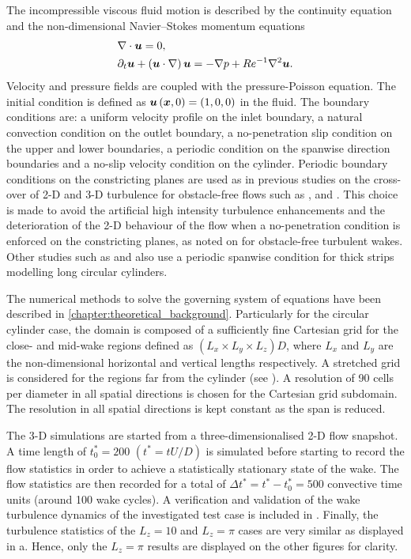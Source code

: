 \documentclass[../main.tex]{subfiles}
\begin{document}
The incompressible viscous fluid motion is described by the continuity equation and the non-dimensional Navier--Stokes momentum equations
\begin{eqnarray}
&\nabla\cdot\boldsymbol{u}=0,\label{eq:mass}\\
&\partial_{t}\boldsymbol{u}+\left(\boldsymbol{u}\cdot\nabla \right) \boldsymbol{u}=-\nabla p+Re^{-1}\nabla^2\boldsymbol{u}.
\end{eqnarray}
Velocity and pressure fields are coupled with the pressure-Poisson equation. 
The initial condition is defined as $\boldsymbol{u}\left(\boldsymbol{x}, 0\right)=\left(1,0,0\right)$ in the fluid.
The boundary conditions are: a uniform velocity profile on the inlet boundary, a natural convection condition on the outlet boundary, a no-penetration slip condition on the upper and lower boundaries, a periodic condition on the spanwise direction boundaries and a no-slip velocity condition on the cylinder.
Periodic boundary conditions on the constricting planes are used as in previous studies on the cross-over of 2-D and 3-D turbulence for obstacle-free flows such as \cite{Smith1996}, \cite{Celani2010} and \cite{Biancofiore2014}.
This choice is made to avoid the artificial high intensity turbulence enhancements and the deterioration of the 2-D behaviour of the flow when a no-penetration condition is enforced on the constricting planes, as noted on \cite{Biancofiore2012} for obstacle-free turbulent wakes.
Other studies such as \cite{Bao2016} and \cite{Bao2019} also use a periodic spanwise condition for thick strips modelling long circular cylinders.

The numerical methods to solve the governing system of equations have been described in \cref{chapter:theoretical_background}. 
Particularly for the circular cylinder case, the domain is composed of a sufficiently fine Cartesian grid for the close- and mid-wake regions defined as $\left(L_x\times L_y\times L_z\right)D$, where $L_x$ and $L_y$ are the non-dimensional horizontal and vertical lengths respectively.
A stretched grid is considered for the regions far from the cylinder (see ).
A resolution of 90 cells per diameter in all spatial directions is chosen for the Cartesian grid subdomain.
The resolution in all spatial directions is kept constant as the span is reduced.

The 3-D simulations are started from a three-dimensionalised 2-D flow snapshot.
A time length of $t^*_0=200$ $(t^* = tU/D)$ is simulated before starting to record the flow statistics in order to achieve a statistically stationary state of the wake.
The flow statistics are then recorded for a total of $\Delta t^*=t^*-t^*_0=500$ convective time units (around 100 wake cycles).
A verification and validation of the wake turbulence dynamics of the investigated test case is included in .
Finally, the turbulence statistics of the $L_z=10$ and $L_z=\pi$ cases are very similar as displayed in a.
Hence, only the $L_z=\pi$ results are displayed on the other figures for clarity.
\end{document}
